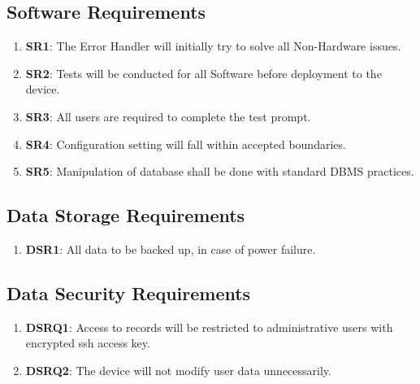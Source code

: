 \documentclass{article}
\begin{document}
\subsection{Software  Requirements}
\begin{enumerate}
	\item\label{SR1}\textbf{SR1}: The Error Handler will initially try to solve all Non-Hardware issues.\\
	\item\label{SR2}\textbf{SR2}: Tests will be conducted for all Software before deployment to the device.\\
	\item\label{SR3}\textbf{SR3}: All users are required to complete the test prompt.\\
	\item\label{SR4}\textbf{SR4}: Configuration setting will fall within accepted boundaries.\\
	\item\label{SR5}\textbf{SR5}: Manipulation of database shall be done with standard DBMS practices.\\
\end{enumerate}

\subsection{Data Storage Requirements }
\begin{enumerate}
	\item\label{DSR1}\textbf{DSR1}: All data to be backed up, in case of power failure.\\
\end{enumerate}


\subsection{Data Security Requirements }
\begin{enumerate}
	\item\label{DSRQ1}\textbf{DSRQ1}: 	Access to records will be restricted to administrative users with encrypted ssh access key.\\
	\item\label{DSRQ2}\textbf{DSRQ2}: 	The device will not modify user data unnecessarily.\\ 	
\end{enumerate}



\pagebreak
\end{document}
